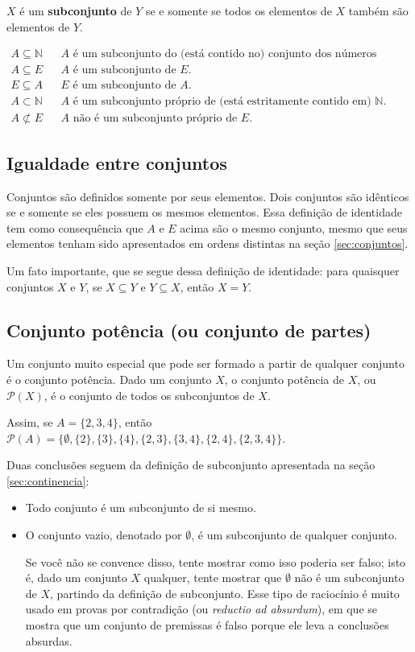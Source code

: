 \documentclass[11pt]{article}
\begin{document}
\(X\) é um \textbf{subconjunto} de \(Y\) se e somente se todos os elementos de \(X\) também são elementos de \(Y\).

\begin{align*}
  A \subseteq \mathbb{N} & & A \text{ é um subconjunto do (está contido no) conjunto dos números naturais.}\\
  A \subseteq E & & A \text{ é um subconjunto de } E.\\
  E \subseteq A & & E \text{ é um subconjunto de } A.\\
  A \subset \mathbb{N} & & A \text{ é um subconjunto próprio de (está estritamente contido em) } \mathbb{N}.\\
  A \not\subset E & & A \text{ não é um subconjunto próprio de } E.
\end{align*}

\subsection{Igualdade entre conjuntos}
\label{sec:igualdade}

Conjuntos são definidos somente por seus elementos. Dois conjuntos são idênticos se e somente se eles possuem os mesmos elementos. Essa definição de identidade tem como consequência que \(A\) e \(E\) acima são o mesmo conjunto, mesmo que seus elementos tenham sido apresentados em ordens distintas na seção \ref{sec:conjuntos}.

Um fato importante, que se segue dessa definição de identidade: para quaisquer conjuntos \(X\) e \(Y\), se \(X\subseteq Y\) e \(Y\subseteq X\), então \(X = Y\).

\subsection{Conjunto potência (ou conjunto de partes)}
\label{sec:conjunto-potencia}

Um conjunto muito especial que pode ser formado a partir de qualquer conjunto é o conjunto potência. Dado um conjunto \(X\), o conjunto potência de \(X\), ou \(\mathcal{P}(X)\), é o conjunto de todos os subconjuntos de \(X\).

Assim, se \(A = \{2, 3, 4\}\), então \(\mathcal{P}(A) = \{\emptyset, \{2\}, \{3\}, \{4\}, \{2, 3\}, \{3, 4\}, \{2, 4\}, \{2, 3, 4\}\}\).

Duas conclusões seguem da definição de subconjunto apresentada na seção \ref{sec:continencia}:
\begin{itemize}
\item Todo conjunto é um subconjunto de si mesmo.
\item O conjunto vazio, denotado por \(\emptyset\), é um subconjunto de qualquer conjunto.

  Se você não se convence disso, tente mostrar como isso poderia ser falso; isto é, dado um conjunto \(X\) qualquer, tente mostrar que \(\emptyset\) não é um subconjunto de \(X\), partindo da definição de subconjunto. Esse tipo de raciocínio é muito usado em provas por contradição (ou \emph{reductio ad absurdum}), em que se mostra que um conjunto de premissas é falso porque ele leva a conclusões absurdas.
\end{itemize}
\end{document}
